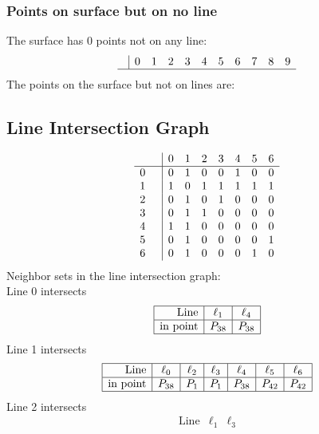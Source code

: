 \documentclass{article}
\begin{document}
{\subsubsection*{Points on surface but on no line}
The surface has 0 points not on any line:\\
$$
\begin{array}{r|*{10}{r}}
 & 0 & 1 & 2 & 3 & 4 & 5 & 6 & 7 & 8 & 9\\
\hline
\end{array}
$$
The points on the surface but not on lines are:\\
\begin{multicols}{2}
\noindent
\end{multicols}
\subsection*{Line Intersection Graph}
{\arraycolsep=1pt
$$
\begin{array}{rr|*{7}r}
 &  & 0 & 1 & 2 & 3 & 4 & 5 & 6\\
\hline
0 &  & 0 & 1 & 0 & 0 & 1 & 0 & 0\\
1 &  & 1 & 0 & 1 & 1 & 1 & 1 & 1\\
2 &  & 0 & 1 & 0 & 1 & 0 & 0 & 0\\
3 &  & 0 & 1 & 1 & 0 & 0 & 0 & 0\\
4 &  & 1 & 1 & 0 & 0 & 0 & 0 & 0\\
5 &  & 0 & 1 & 0 & 0 & 0 & 0 & 1\\
6 &  & 0 & 1 & 0 & 0 & 0 & 1 & 0\\
\end{array}
$$
}%
Neighbor sets in the line intersection graph:\\
Line 0 intersects 
$$
\begin{array}{|r*{2}{|c}|}
\hline
\mbox{Line}  & \ell_{1} & \ell_{4}\\
\hline
\mbox{in point}  & P_{38} & P_{38}\\
\hline
\end{array}
$$
Line 1 intersects 
$$
\begin{array}{|r*{6}{|c}|}
\hline
\mbox{Line}  & \ell_{0} & \ell_{2} & \ell_{3} & \ell_{4} & \ell_{5} & \ell_{6}\\
\hline
\mbox{in point}  & P_{38} & P_{1} & P_{1} & P_{38} & P_{42} & P_{42}\\
\hline
\end{array}
$$
Line 2 intersects 
$$
\begin{array}{|r*{2}{|c}|}
\hline
\mbox{Line}  & \ell_{1} & \ell_{3}\\

\end{array}$$}
\end{document}
